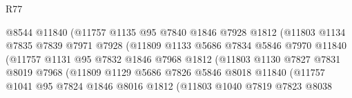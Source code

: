 \begin{lexlean}{R77}
\begin{coremodule}
                                  @8544
                                  @11840
                                  (@11757
                                    @1135
                                    @95
                                    @7840
                                    @1846
                                    @7928
                                    @1812
                                    (@11803
                                      @1134
                                      @7835
                                      @7839
                                      @7971
                                      @7928
                                      (@11809
                                        @1133
                                        @5686
                                        @7834
                                        @5846
                                        @7970
                                        @11840
                                        (@11757
                                          @1131
                                          @95
                                          @7832
                                          @1846
                                          @7968
                                          @1812
                                          (@11803
                                            @1130
                                            @7827
                                            @7831
                                            @8019
                                            @7968
                                            (@11809
                                              @1129
                                              @5686
                                              @7826
                                              @5846
                                              @8018
                                              @11840
                                              (@11757
                                                @1041
                                                @95
                                                @7824
                                                @1846
                                                @8016
                                                @1812
                                                (@11803
                                                  @1040
                                                  @7819
                                                  @7823
                                                  @8038

\end{coremodule}
\end{lexlean}
